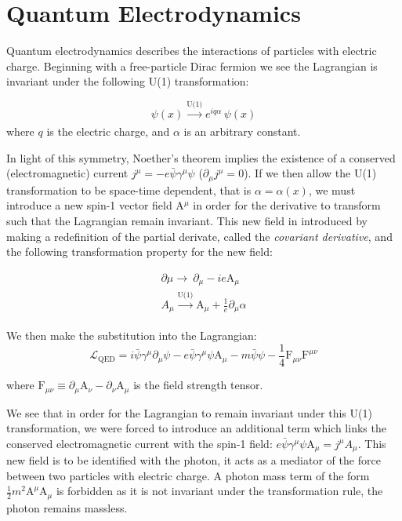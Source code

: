\section{Quantum Electrodynamics}

Quantum electrodynamics describes the interactions of particles with electric charge. Beginning with a free-particle Dirac fermion we see the Lagrangian is invariant under the following U(1) transformation:

\begin{equation}
\psi(x)  \xrightarrow[]{\text{U(1)}} e^{i q \alpha}\,\psi(x)
\label{eq:u1}
\end{equation}
where $q$ is the electric charge, and $\alpha$ is an arbitrary constant.

In light of this symmetry, Noether's theorem implies the existence of a conserved (electromagnetic) current $j^{\mu} = -e\bar{\psi}\gamma^{\mu}\psi$ ($\partial_{\mu}j^{\mu}=0$). If we then allow the U(1) transformation to be space-time dependent, that is $\alpha = \alpha(x)$, we must introduce a new spin-1 vector field A$^{\mu}$ in order for the derivative to transform such that the Lagrangian remain invariant. This new field in introduced by making a redefinition of the partial derivate, called the \textit{covariant derivative}, and the following transformation property for the new field:

\begin{equation}
\begin{array}{l}
\partial{\mu} \rightarrow\ \partial_{\mu} - ie\mathrm{A}_{\mu}
\\A_{\mu} \xrightarrow[]{\text{U(1)}} \mathrm{A}_{\mu} + \frac{1}{e} \partial_{\mu} \alpha
 \end{array}
\end{equation}

We then make the substitution into the Lagrangian:
\begin{equation}
\mathcal{L}_{\mathrm{QED}} =
i\bar{\psi}\gamma^{\mu}\partial_{\mu}\psi
- e\bar{\psi}\gamma^{\mu}\psi \mathrm{A}_{\mu}
- m\bar{\psi}\psi
- \frac{1}{4}\mathrm{F}_{\mu\nu} \mathrm{F}^{\mu\nu}
\end{equation}

where $\mathrm{F}_{\mu\nu}\equiv\partial_{\mu}\mathrm{A}_{\nu} - \partial_{\nu}\mathrm{A}_{\mu}$ is the field strength tensor.

We see that in order for the Lagrangian to remain invariant under this U(1) transformation, we were forced to introduce an additional term which links the conserved electromagnetic current with the spin-1 field: $e\bar{\psi}\gamma^{\mu}\psi \mathrm{A}_{\mu} = j^{\mu}A_{\mu}$. This new field is to be identified with the photon,  it acts as a mediator of the force between two particles with electric charge. A photon mass term of the form $\frac{1}{2}m^{2}\mathrm{A}^{\mu}\mathrm{A}_{\mu}$ is forbidden as it is not invariant under the transformation rule, the photon remains massless.

